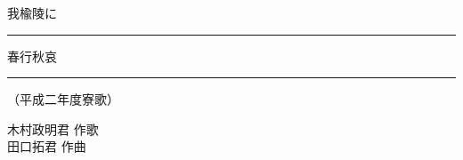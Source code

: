 \documentclass[10pt,b5j]{tarticle} %
\begin{document}
\begin{minipage}[c]{0.7\hsize} %
    \begin{center}
        {\LARGE
            我楡陵に %
        }
        {\large 
            \rule[0.0em]{1.0em}{0.05em} 春行秋哀 \rule[0.0em]{1.0em}{0.05em}
        }
        {\small 
            （平成二年度寮歌） %
        }
    \end{center}
\end{minipage}
\begin{minipage}[c]{0.3\hsize} %
    \begin{flushright} %
        木村政明君 作歌\\田口拓君 作曲 %
    \end{flushright}
\end{minipage}
\end{document}
